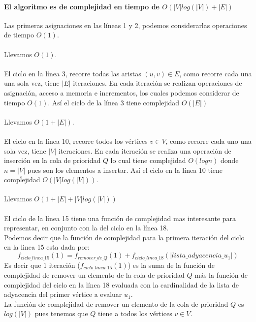 \documentclass[12pt]{article}
\begin{document}
\paragraph{El algoritmo es de complejidad en tiempo de $O(|V|log(|V|) + |E|)$}
Las primeras asignaciones en las líneas 1 y 2, podemos considerarlas operaciones de tiempo $O(1)$.\\\\
Llevamos $O(1)$.\\\\
El ciclo en la línea 3, recorre todas las aristas $(u,v)\in E$, como recorre cada una una sola vez, tiene $|E|$ iteraciones. En cada iteración se realizan operaciones de asignación, acceso a memoria e incrementos, los cuales podemos considerar de tiempo $O(1)$. Así el ciclo de la línea 3 tiene complejidad $O(|E|)$\\\\
Llevamos $O(1 + |E|)$.\\\\
El ciclo en la línea 10, recorre todos los vértices $v\in V$, como recorre cada uno una sola vez, tiene $|V|$ iteraciones. En cada iteración se realiza una operación de inserción en la cola de prioridad $Q$ lo cual tiene complejidad $O(logn)$ donde $n=|V|$ pues son los elementos a insertar. Así el ciclo en la línea 10 tiene compĺejidad $O(|V|log(|V|))$.\\\\
Llevamos $O(1 + |E| + |V|log(|V|))$\\\\
El ciclo de la línea 15 tiene una función de complejidad mas interesante para representar, en conjunto con la del ciclo en la línea 18.\\
Podemos decir que la función de complejidad para la primera iteración del ciclo en la linea 15 esta dada por:\\
\begin{equation}
f_{ciclo\_linea\_15}(1)= f_{remover\_de\_Q}(1) + f_{ciclo\_linea\_18}(|lista\_adyacencia\_u_1|)
\end{equation}
Es decir que $1$ iteración ($f_{ciclo\_linea\_15}(1)$) es la suma de la función de complejidad de remover un elemento de la cola de prioridad $Q$ más la función de complejidad del ciclo en la línea 18 evaluada con la cardinalidad de la lista de adyacencia del primer vértice a evaluar $u_1$.\\
La función de complejidad de remover un elemento de la cola de prioridad $Q$ es $log(|V|)$ pues tenemos que $Q$ tiene a todos los vértices $v \in V$.\\
\end{document}
